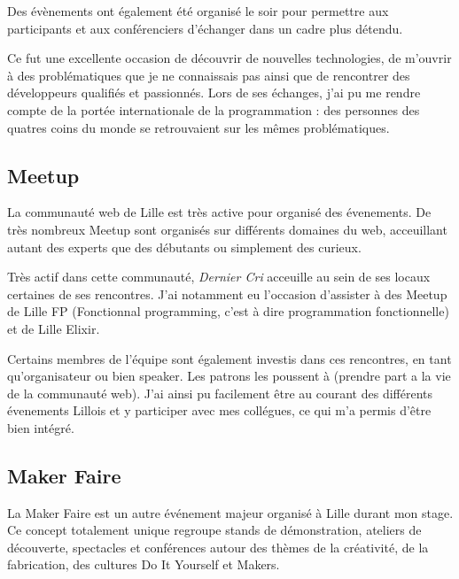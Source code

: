 \bigskip

Des évènements ont également été organisé le soir pour permettre aux
participants et aux conférenciers d'échanger dans un cadre plus détendu.

\bigskip

Ce fut une excellente occasion de découvrir de nouvelles technologies,
de m'ouvrir à des problématiques que je ne connaissais pas ainsi que de
rencontrer des développeurs qualifiés et passionnés. Lors de ses
échanges, j'ai pu me rendre compte de la portée internationale de la
programmation : des personnes des quatres coins du monde se retrouvaient
sur les mêmes problématiques.

\bigskip

\subsection{Meetup}\label{meetup}

\bigskip

La communauté web de Lille est très active pour organisé des évenements.
De très nombreux Meetup sont organisés sur différents domaines du web,
acceuillant autant des experts que des débutants ou simplement des
curieux.

\bigskip

Très actif dans cette communauté, \emph{Dernier Cri} acceuille au sein
de ses locaux certaines de ses rencontres. J'ai notamment eu l'occasion
d'assister à des Meetup de Lille FP (Fonctionnal programming, c'est à
dire programmation fonctionnelle) et de Lille Elixir.

\bigskip

Certains membres de l'équipe sont également investis dans ces
rencontres, en tant qu'organisateur ou bien speaker. Les patrons les
poussent à (prendre part a la vie de la communauté web). J'ai ainsi pu
facilement être au courant des différents évenements Lillois et y
participer avec mes collégues, ce qui m'a permis d'être bien intégré.

\bigskip

\subsection{Maker Faire}\label{maker-faire}

\bigskip

La Maker Faire est un autre événement majeur organisé à Lille durant mon
stage. Ce concept totalement unique regroupe stands de démonstration,
ateliers de découverte, spectacles et conférences autour des thèmes de
la créativité, de la fabrication, des cultures Do It Yourself et Makers.

